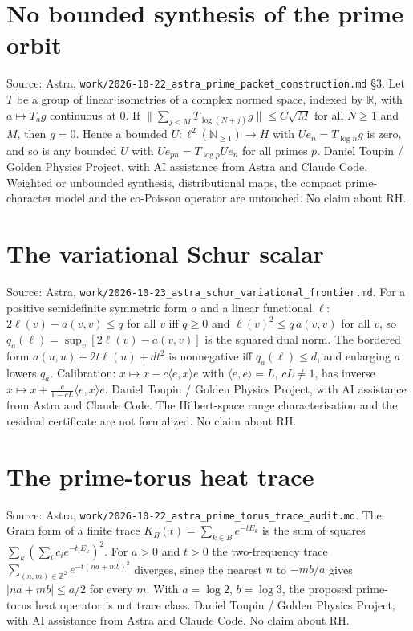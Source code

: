 \documentclass{report}
\theoremstyle{definition}
\begin{document}
\begin{itemize}
\begin{itemize}
\section{No bounded synthesis of the prime orbit}
Source: Astra, \texttt{work/2026-10-22\_astra\_prime\_packet\_construction.md} \S3. Let $T$ be a group of linear isometries of a complex normed space,
indexed by $\mathbb R$, with $a\mapsto T_ag$ continuous at $0$. If $\|\sum_{j<M}T_{\log(N+j)}g\|\le C\sqrt M$ for all $N\ge1$ and $M$, then $g=0$. Hence a
bounded $U:\ell^2(\mathbb N_{\ge1})\to H$ with $Ue_n=T_{\log n}g$ is zero, and so is any bounded $U$ with $Ue_{pn}=T_{\log p}Ue_n$ for all primes $p$.
Daniel Toupin / Golden Physics Project, with AI assistance from Astra and Claude Code. Weighted or unbounded synthesis, distributional maps, the
compact prime-character model and the co-Poisson operator are untouched. No claim about RH.
\section{The variational Schur scalar}
Source: Astra, \texttt{work/2026-10-23\_astra\_schur\_variational\_frontier.md}. For a positive semidefinite symmetric form $a$ and a linear functional
$\ell$: $2\ell(v)-a(v,v)\le q$ for all $v$ iff $q\ge0$ and $\ell(v)^2\le q\,a(v,v)$ for all $v$, so $q_a(\ell)=\sup_v[2\ell(v)-a(v,v)]$ is the squared dual norm.
The bordered form $a(u,u)+2t\ell(u)+dt^2$ is nonnegative iff $q_a(\ell)\le d$, and enlarging $a$ lowers $q_a$. Calibration: $x\mapsto x-c\langle e,x\rangle e$ with
$\langle e,e\rangle=L$, $cL\ne1$, has inverse $x\mapsto x+\frac{c}{1-cL}\langle e,x\rangle e$. Daniel Toupin / Golden Physics Project, with AI assistance from Astra and
Claude Code. The Hilbert-space range characterisation and the residual certificate are not formalized. No claim about RH.

\section{The prime-torus heat trace}
Source: Astra, \texttt{work/2026-10-22\_astra\_prime\_torus\_trace\_audit.md}. The Gram form of a finite trace $K_B(t)=\sum_{k\in B}e^{-tE_k}$ is the sum of squares
$\sum_k(\sum_ic_ie^{-t_iE_k})^2$. For $a>0$ and $t>0$ the two-frequency trace $\sum_{(n,m)\in\mathbb Z^2}e^{-t(na+mb)^2}$ diverges, since the nearest $n$ to $-mb/a$
gives $|na+mb|\le a/2$ for every $m$. With $a=\log2$, $b=\log3$, the proposed prime-torus heat operator is not trace class. Daniel Toupin / Golden
Physics Project, with AI assistance from Astra and Claude Code. No claim about RH.


\end{itemize}
\end{itemize}
\end{document}
